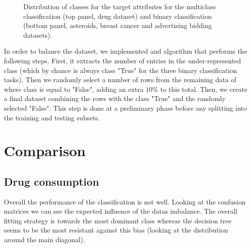 \documentclass{article}
\begin{document}
\begin{figure}[h!]
\begin{minipage}[b]{0.32\textwidth}
    \end{minipage}
	\caption{Distribution of classes for the target attributes for the multiclass classification (top panel, drug dataset) and binary classification (bottom panel, asteroids, breast cancer and advertising bidding datasets).}
	\label{fig:imbalance}
\end{figure}

In order to balance the dataset, we implemented and algorithm that performs the following steps.
First, it extracts the number of entries in the under-represented class (which by chance is always class "True" for the three binary classification tasks). Then we randomly select a number of rows from the remaining data of where class is equal to "False", adding an extra $10\%$ to this total. Then, we create a final dataset combining the rows with the class "True" and the randomly selected "False".
This step is done at a preliminary phase before any splitting into the training and testing subsets.




\section{Comparison}

\subsection{Drug consumption}

Overall the performance of the classification is not well. Looking at the confusion matrices we can see the expected influence of the datas imbalance. The overall fitting strategy is towards the most dominant class whereas the decision tree seems to be the most resistant against this bias (looking at the distribution around the main diagonal).
\end{document}
